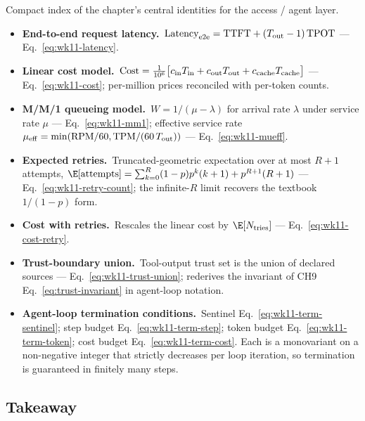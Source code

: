 \begin{derivledger}
Compact index of the chapter's central identities for the access /
agent layer.
\begin{itemize}
  \item \textbf{End-to-end request latency.}\
        $\mathrm{Latency}_{\rm e2e} = \mathrm{TTFT} + (T_{\rm out} - 1)\, \mathrm{TPOT}$
        --- Eq.~\eqref{eq:wk11-latency}.
  \item \textbf{Linear cost model.}\
        $\mathrm{Cost} = \tfrac{1}{10^{6}}\bigl[c_{\rm in} T_{\rm in} + c_{\rm out} T_{\rm out} + c_{\rm cache} T_{\rm cache}\bigr]$
        --- Eq.~\eqref{eq:wk11-cost}; per-million prices reconciled
        with per-token counts.
  \item \textbf{M/M/1 queueing model.}\
        $W = 1 / (\mu - \lambda)$ for arrival rate $\lambda$ under
        service rate $\mu$ --- Eq.~\eqref{eq:wk11-mm1};
        effective service rate
        $\mu_{\rm eff} = \min(\mathrm{RPM} / 60, \mathrm{TPM} / (60\, T_{\rm out}))$
        --- Eq.~\eqref{eq:wk11-mueff}.
  \item \textbf{Expected retries.}\
        Truncated-geometric expectation over at most $R+1$
        attempts, $\E[\text{attempts}] = \sum_{k=0}^{R}(1-p)p^k(k+1) + p^{R+1}(R+1)$
        --- Eq.~\eqref{eq:wk11-retry-count}; the infinite-$R$ limit
        recovers the textbook $1/(1-p)$ form.
  \item \textbf{Cost with retries.}\
        Rescales the linear cost by $\E[N_{\rm tries}]$
        --- Eq.~\eqref{eq:wk11-cost-retry}.
  \item \textbf{Trust-boundary union.}\
        Tool-output trust set is the union of declared sources
        --- Eq.~\eqref{eq:wk11-trust-union}; rederives the
        invariant of CH9 Eq.~\eqref{eq:trust-invariant}
        in agent-loop notation.
  \item \textbf{Agent-loop termination conditions.}\
        Sentinel Eq.~\eqref{eq:wk11-term-sentinel};
        step budget Eq.~\eqref{eq:wk11-term-step};
        token budget Eq.~\eqref{eq:wk11-term-token};
        cost budget Eq.~\eqref{eq:wk11-term-cost}. Each is a
        monovariant on a non-negative integer that strictly
        decreases per loop iteration, so termination is guaranteed
        in finitely many steps.
\end{itemize}
\end{derivledger}

\subsection{Takeaway}

